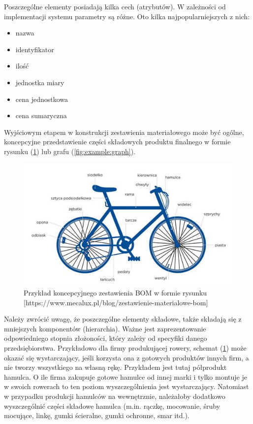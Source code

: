 \documentclass[12pt,twoside]{article}
\begin{document}
Poszczególne elementy posiadają kilka cech (atrybutów). W zależności od implementacji systemu parametry są różne. Oto kilka najpopularniejszych z nich:

\begin{itemize}[label=-,labelsep=0.4cm,leftmargin=0.6cm]
\item nazwa
\item identyfikator
\item ilość
\item jednostka miary
\item cena jednostkowa
\item cena sumaryczna
\end{itemize}

Wyjściowym etapem w konstrukcji zestawienia materiałowego może być ogólne, koncepcyjne przedstawienie części składowych produktu finalnego w formie rysunku (\ref{fig:example:drawing}) lub grafu (\ref{fig:example:graph}).

\begin{figure}
	\centering
	\includegraphics[width=\textwidth]{figures/examples/drawing.jpg}
	\caption{Przykład koncepcyjnego zestawienia BOM w formie rysunku [https://www.mecalux.pl/blog/zestawienie-materialowe-bom]}
\label{fig:example:drawing}
\end{figure}

Należy zwrócić uwagę, że poszczególne elementy składowe, także składają się z mniejszych komponentów (hierarchia). Ważne jest zaprezentowanie odpowiedniego stopnia złożoności, który zależy od specyfiki danego przedsiębiorstwa. Przykładowo dla firmy produkującej rowery, schemat (\ref{fig:example:drawing}) może okazać się wystarczający, jeśli korzysta ona z gotowych produktów innych firm, a nie tworzy wszystkiego na własną rękę. Przykładem jest tutaj półprodukt hamulca. O ile firma zakupuje gotowe hamulce od innej marki i tylko montuje je w swoich rowerach to ten poziom wyszczególnienia jest wystarczający. Natomiast w przypadku produkcji hamulców na wewnętrznie, należałoby dodatkowo wyszczególnić części składowe hamulca (m.in. rączkę, mocowanie, śruby mocujące, linkę, gumki ścieralne, gumki ochronne, smar itd.).
\end{document}
